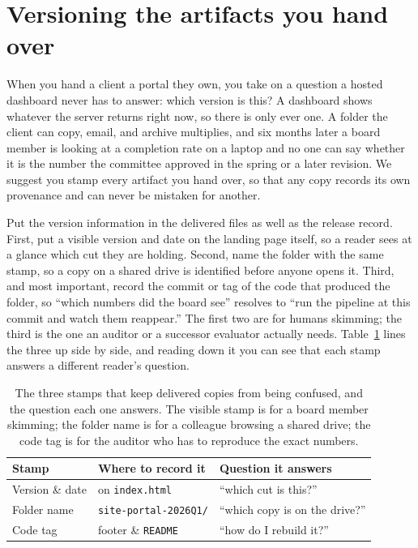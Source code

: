 \section{Versioning the artifacts you hand over}\label{sec:versioning}
When you hand a client a portal they own, you take on a question a hosted dashboard never has to answer: which version is this? A dashboard shows whatever the server returns right now, so there is only ever one. A folder the client can copy, email, and archive multiplies, and six months later a board member is looking at a completion rate on a laptop and no one can say whether it is the number the committee approved in the spring or a later revision. We suggest you stamp every artifact you hand over, so that any copy records its own provenance and can never be mistaken for another.

Put the version information in the delivered files as well as the release record. First, put a visible version and date on the landing page itself, so a reader sees at a glance which cut they are holding. Second, name the folder with the same stamp, so a copy on a shared drive is identified before anyone opens it. Third, and most important, record the commit or tag of the code that produced the folder, so \enquote{which numbers did the board see} resolves to \enquote{run the pipeline at this commit and watch them reappear.} The first two are for humans skimming; the third is the one an auditor or a successor evaluator actually needs. Table~\ref{tab:stamps} lines the three up side by side, and reading down it you can see that each stamp answers a different reader's question.

\begin{table}[htbp]
\centering
\footnotesize
\caption[What to stamp on a delivered portal]{The three stamps that keep delivered copies from being confused, and the question each one answers. The visible stamp is for a board member skimming; the folder name is for a colleague browsing a shared drive; the code tag is for the auditor who has to reproduce the exact numbers.}
\label{tab:stamps}
\begin{tabular}{lll}
\hline
Stamp & Where to record it & Question it answers \\
\hline
Version \& date & on \texttt{index.html} & \enquote{which cut is this?} \\
Folder name     & \texttt{site-portal-2026Q1/} & \enquote{which copy is on the drive?} \\
Code tag        & footer \& \texttt{README} & \enquote{how do I rebuild it?} \\
\hline
\end{tabular}
\end{table}

